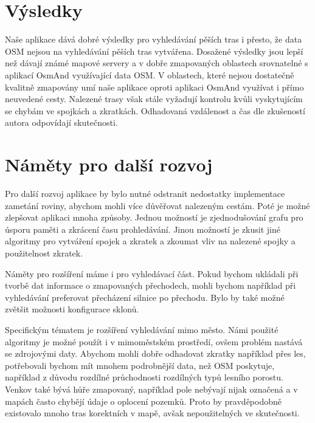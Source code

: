 \section*{Výsledky}
Naše aplikace dává dobré výsledky pro vyhledávání pěších tras i přesto, že data
OSM nejsou na vyhledávání pěších tras vytvářena. Dosažené výsledky jsou lepší
než dávají známé mapové servery a v dobře zmapovaných oblastech srovnatelné s
aplikací OsmAnd využívající data OSM. V oblastech, které nejsou dostatečně
kvalitně zmapovány umí naše aplikace oproti aplikaci OsmAnd využívat i přímo
neuvedené cesty.  Nalezené trasy však stále vyžadují kontrolu kvůli vyskytujícím
se chybám ve spojkách a zkratkách.  Odhadovaná vzdálenost a čas dle zkušeností
autora odpovídají skutečnosti. 


\section*{Náměty pro další rozvoj}
Pro další rozvoj aplikace by bylo nutné odstranit nedostatky implementace
zametání roviny, abychom mohli více důvěřovat nalezeným cestám. Poté je možné
zlepšovat aplikaci mnoha způsoby. Jednou možností je zjednodušování grafu pro
úsporu paměti a zkrácení času prohledávání. Jinou možností je zkusit jiné
algoritmy pro vytváření spojek a zkratek a zkoumat vliv na nalezené spojky a
použitelnost zkratek.

Náměty pro rozšíření máme i pro vyhledávací část. Pokud bychom ukládali při
tvorbě dat informace o zmapovaných přechodech, mohli bychom například při
vyhledávání preferovat přecházení silnice po přechodu. Bylo by také možné
zvětšit možnosti konfigurace sklonů. 

Specifickým tématem je rozšíření vyhledávání mimo město. Námi použité algoritmy
je možné použít i v mimoměstském prostředí, ovšem problém nastává se zdrojovými
daty. Abychom mohli dobře odhadovat zkratky například přes les, potřebovali
bychom mít mnohem podrobnější data, než OSM poskytuje, například z důvodu
rozdílné průchodnosti rozdílných typů lesního porostu. Venkov také bývá hůře
zmapovaný, například pole nebývají nijak označená a v mapách často chybějí údaje o
oplocení pozemků. Proto by pravděpodobně existovalo mnoho tras korektních v
mapě, avšak nepoužitelných ve skutečnosti.
